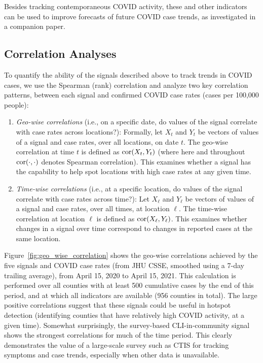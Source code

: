 \documentclass[9pt,twocolumn,twoside,lineno]{pnas-new}
\begin{document}
Besides tracking contemporaneous COVID activity, these and other indicators can
be used to improve forecasts of future COVID case trends, as investigated in a
companion paper.

\subsection{Correlation Analyses}

To quantify the ability of the signals described above to track trends in COVID
cases, we use the Spearman (rank) correlation and analyze two key correlation
patterns, between each signal and confirmed COVID case rates (cases per 100,000
people):

\begin{enumerate}
\item \textit{Geo-wise correlations} (i.e., on a specific date, do values of the
  signal correlate with case rates across locations?): Formally, let $X_t$ and
  $Y_t$ be vectors of values of a signal and case rates, over all locations, on
  date $t$. The geo-wise correlation at time $t$ is defined as $\mathrm{cor}(X_t,
  Y_t)$ (where here and throughout $\mathrm{cor}(\cdot,\cdot)$ denotes Spearman
  correlation). This examines whether a signal has the capability to help spot
  locations with high case rates at any given time.

\item \textit{Time-wise correlations} (i.e., at a specific location, do values
  of the signal correlate with case rates across time?): Let $X_\ell$
  and $Y_\ell$ be vectors of values of a signal and case rates, over all
  times, at location $\ell$. The time-wise correlation at location $\ell$ is
  defined as $\mathrm{cor}(X_\ell, Y_\ell)$. This examines whether changes in a signal
  over time correspond to changes in reported cases at the same
  location.
\end{enumerate}

Figure~\ref{fig:geo_wise_correlation} shows the geo-wise correlations achieved
by the five signals and COVID case rates (from JHU CSSE, smoothed using a 7-day
trailing average), from April 15, 2020 to April 15, 2021. This calculation is
performed over all counties with at least 500 cumulative cases by the end of
this period, and at which all indicators are available (956 counties in
total). The large positive correlations suggest that these signals could be
useful in hotspot detection (identifying counties that have relatively high
COVID activity, at a given time). Somewhat surprisingly, the survey-based
CLI-in-community signal shows the strongest correlations for much of the time
period. This clearly demonstrates the value of a large-scale survey such as CTIS
for tracking symptoms and case trends, especially when other data is unavailable.
\end{document}

